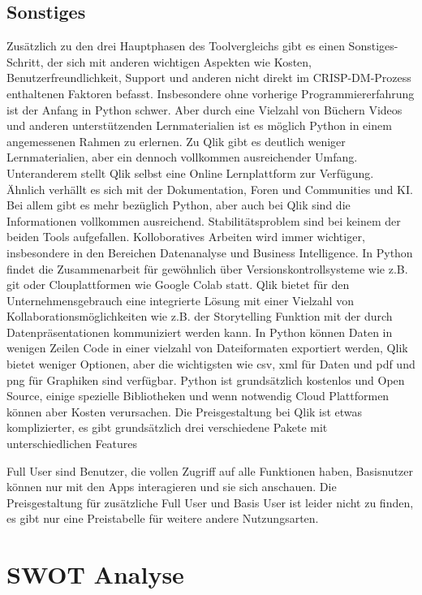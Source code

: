 \documentclass[12pt]{article}
\begin{document}
	\subsection{Sonstiges}
	Zusätzlich zu den drei Hauptphasen des Toolvergleichs gibt es einen Sonstiges-Schritt, der sich mit anderen wichtigen Aspekten wie Kosten, Benutzerfreundlichkeit, Support und anderen nicht direkt im CRISP-DM-Prozess enthaltenen Faktoren befasst.
	Insbesondere ohne vorherige Programmiererfahrung ist der Anfang in Python schwer. Aber durch eine Vielzahl von Büchern Videos und anderen unterstützenden Lernmaterialien ist es möglich Python in einem angemessenen Rahmen zu erlernen. Zu Qlik gibt es deutlich weniger Lernmaterialien, aber ein dennoch vollkommen ausreichender Umfang. Unteranderem stellt Qlik selbst eine Online Lernplattform zur Verfügung. Ähnlich verhällt es sich mit der Dokumentation, Foren und Communities und KI. Bei allem gibt es mehr bezüglich Python, aber auch bei Qlik sind die Informationen vollkommen ausreichend. Stabilitätsproblem sind bei keinem der beiden Tools aufgefallen. Kolloboratives Arbeiten wird immer wichtiger, insbesondere in den Bereichen Datenanalyse und Business Intelligence. In Python findet die Zusammenarbeit für gewöhnlich über Versionskontrollsysteme wie z.B. git oder Clouplattformen wie Google Colab statt. Qlik bietet für den Unternehmensgebrauch eine integrierte Lösung mit einer Vielzahl von Kollaborationsmöglichkeiten wie z.B. der Storytelling Funktion mit der durch Datenpräsentationen kommuniziert werden kann.
	In Python können Daten in wenigen Zeilen Code in einer vielzahl von Dateiformaten exportiert werden, Qlik bietet weniger Optionen, aber die wichtigsten wie csv, xml für Daten und pdf und png für Graphiken sind verfügbar. Python ist grundsätzlich kostenlos und Open Source, einige spezielle Bibliotheken und wenn notwendig Cloud Plattformen können aber Kosten verursachen. Die Preisgestaltung bei Qlik ist etwas komplizierter, es gibt grundsätzlich drei verschiedene Pakete mit unterschiedlichen Features %
	
	Full User sind Benutzer, die vollen Zugriff auf alle Funktionen haben, Basisnutzer können nur mit den Apps interagieren und sie sich anschauen.
	Die Preisgestaltung für zusätzliche Full User und Basis User ist leider nicht zu finden, es gibt nur eine Preistabelle für weitere andere Nutzungsarten.
	\section{SWOT Analyse}
	
\end{document}
